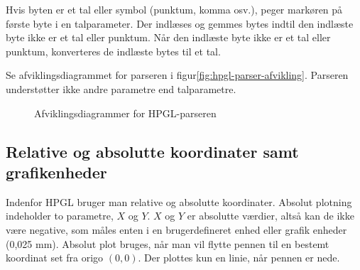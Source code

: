 Hvis byten er et tal eller symbol (punktum, komma osv.), peger markøren på første byte
i en talparameter. Der indlæses og gemmes bytes indtil den indlæste
byte ikke er et tal eller punktum. Når den indlæste byte ikke er et
tal eller punktum, konverteres de indlæste bytes til et tal.

Se afviklingsdiagrammet for parseren i
figur\vref{fig:hpgl-parser-afvikling}. Parseren understøtter ikke
andre parametre end talparametre.

\begin{figure}[htbp]
  \centering
  \qquad
  \caption{Afviklingsdiagrammer for HPGL-parseren}
  \label{fig:hpgl-parser-afvikling}
\end{figure}


\subsection{Relative og absolutte koordinater samt grafikenheder}
\label{sc:relativ-absolut}

Indenfor HPGL bruger man relative og absolutte koordinater. Absolut
plotning indeholder to parametre, $X$ og $Y$. $X$ og $Y$ er absolutte værdier,
altså kan de ikke være negative, som måles enten i en brugerdefineret
enhed eller grafik enheder (0,025 mm). Absolut plot bruges, når man vil
flytte pennen til en bestemt koordinat set fra origo $(0, 0)$. Der
plottes kun en linie, når pennen er nede.


